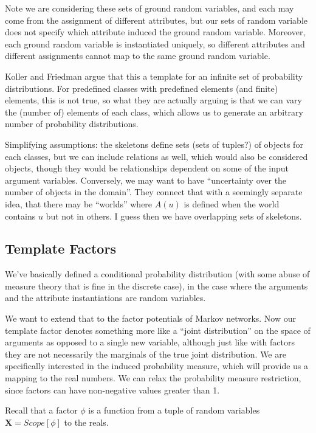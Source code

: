 \documentclass[11pt]{article}
\begin{document}
  Note we are considering these sets of ground random variables, and each may come from the assignment of different attributes, but our sets of random variable does not specify which attribute induced the ground random variable.  
Moreover, each ground random variable is instantiated uniquely, so different attributes and different assignments cannot map to the same ground random variable.


Koller and Friedman argue that this a template for an infinite set of probability distributions.  For predefined classes with predefined elements (and finite) elements, this is not true, so what they are actually arguing is that we can vary the (number of) elements of each class, which allows us to generate an arbitrary number of probability distributions.


Simplifying assumptions: the skeletons define sets (sets of tuples?) of objects for each classes, but we can include relations as well, which would also be considered objects, though they would be relationships dependent on some of the input argument variables.  
Conversely, we may want to have ``uncertainty over the number of objects in the domain''.  
They connect that with a seemingly separate idea, that there may be ``worlds'' where $A(u)$ is defined when the world contains $u$ but not in others. I guess then we have overlapping sets of skeletons.

\subsection{Template Factors}

We've basically defined a conditional probability distribution (with some abuse of measure theory that is fine in the discrete case), in the case where the arguments and the attribute instantiations are random variables.

We want to extend that to the factor potentials of Markov networks.  Now our template factor denotes something more like a ``joint distribution'' on the space of arguments as opposed to a single new variable, although just like with factors they are not necessarily the marginals of the true joint distribution.
We are specifically interested in the induced probability measure, which will provide us a mapping to the real numbers.  We can relax the probability measure restriction, since factors can have non-negative values greater than 1.

Recall that a factor $\phi$ is a function from a tuple of random variables $\mathbf{X} = Scope\left[ \phi \right]$ to the reals.
\end{document}

